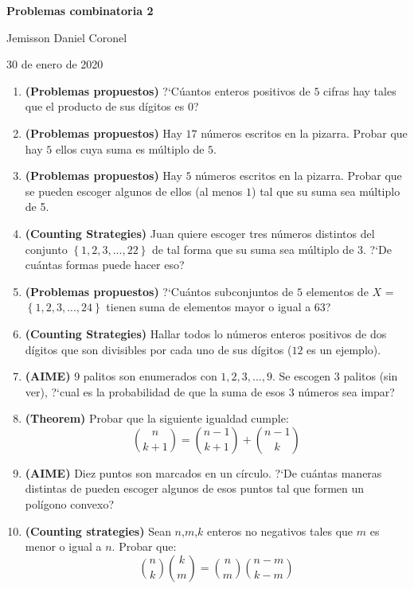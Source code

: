 \documentclass[10pt,a4 paper]{article}
\begin{document}
\chead{}

\begin{center}
\textbf{\Large{Problemas combinatoria 2}}
\end{center}

\begin{center}
Jemisson Daniel Coronel
\end{center}

\begin{center}
30 de enero de 2020
\end{center}
\vspace{9mm}
\begin{enumerate}

\item \textbf{(Problemas propuestos)} ?`C\'uantos enteros positivos de $5$ cifras hay tales que el producto de sus d\'igitos es $0$?

\item \textbf{(Problemas propuestos)} Hay $17$ n\'umeros escritos en la pizarra. Probar que hay $5$ ellos cuya suma es m\'ultiplo de $5$. 

\item \textbf{(Problemas propuestos)} Hay $5$ n\'umeros escritos en la pizarra. Probar que se pueden escoger algunos de ellos (al menos $1$) tal que su suma sea m\'ultiplo de 5.

\item \textbf{(Counting Strategies)} Juan quiere escoger tres n\'umeros distintos del conjunto $\left \{1, 2, 3, ..., 22 \right \}$ de tal forma que su suma sea m\'ultiplo de $3$. ?`De cu\'antas formas puede hacer eso? 

\item \textbf{(Problemas propuestos)} ?`Cu\'antos subconjuntos de $5$ elementos de $X$ = $\left \{1, 2, 3, ..., 24 \right \}$ tienen suma de elementos mayor o igual a $63$?   

\item \textbf{(Counting Strategies)} Hallar todos lo n\'umeros enteros positivos de dos d\'igitos que son divisibles por cada uno de sus d\'igitos ($12$ es un ejemplo).   

\item \textbf{(AIME)} 9 palitos son enumerados con $1, 2, 3, ..., 9$. Se escogen $3$ palitos (sin ver), ?`cual es la probabilidad de que la suma de esos $3$ n\'umeros sea impar? 

\item \textbf{(Theorem)} Probar que la siguiente igualdad cumple:
$$\binom{n}{k + 1} = \binom{n - 1}{k + 1} + \binom{n - 1}{k}$$

\item \textbf{(AIME)} Diez puntos son marcados en un c\'irculo. ?`De cu\'antas maneras distintas de pueden escoger algunos de esos puntos tal que formen un pol\'igono convexo? 

\item \textbf{(Counting strategies)} Sean $n$,$m$,$k$ enteros no negativos tales que $m$ es menor o igual a $n$. Probar que:
$$\binom{n}{k}\binom{k}{m} = \binom{n}{m}\binom{n - m}{k - m}$$



\end{enumerate}
\end{document}
